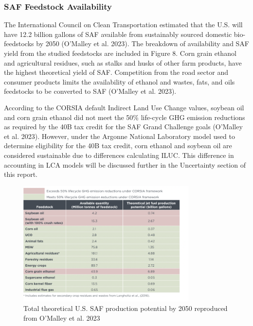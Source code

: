 \documentclass[12pt]{article}
\begin{document}
\subsubsection{SAF Feedstock Availability}

The International Council on Clean Transportation estimated that the U.S. will have 12.2 billion gallons of SAF available from sustainably sourced domestic bio-feedstocks by 2050 (O’Malley et al. 2023). The breakdown of availability and SAF yield from the studied feedstocks are included in Figure 8. Corn grain ethanol and agricultural residues, such as stalks and husks of other farm products, have the highest theoretical yield of SAF. Competition from the road sector and consumer products limits the availability of ethanol and wastes, fats, and oils feedstocks to be converted to SAF (O’Malley et al. 2023). 

According to the CORSIA default Indirect Land Use Change values, soybean oil and corn grain ethanol did not meet the 50\% life-cycle GHG emission reductions as required by the 40B tax credit for the SAF Grand Challenge goals (O’Malley et al. 2023). However, under the Argonne National Laboratory model used to determine eligibility for the 40B tax credit, corn ethanol and soybean oil are considered sustainable due to differences calculating ILUC. This difference in accounting in LCA models will be discussed further in the Uncertainty section of this report.


\begin{figure}[H]
\centering
\includegraphics[width=0.8\textwidth]{Figure 10.png} %
\caption{Total theoretical U.S. SAF production potential by 2050 reproduced from O’Malley et al. 2023}
\label{fig:figure10}
\end{figure}
\end{document}
